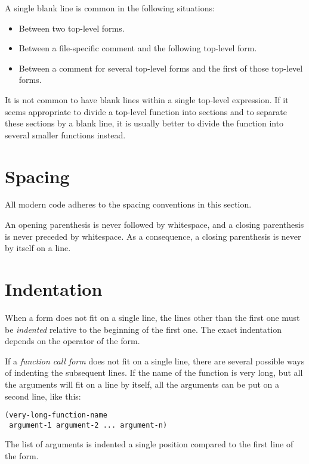 A single blank line is common in the following situations:

\begin{itemize}
\item Between two top-level forms.
\item Between a file-specific comment and the following top-level
  form.
\item Between a comment for several top-level forms and the first
  of those top-level forms.
\end{itemize}

It is not common to have blank lines within a single top-level
expression.  If it seems appropriate to divide a top-level function
into sections and to separate these sections by a blank line, it is
usually better to divide the function into several smaller functions
instead.

\section{Spacing}

All modern \commonlisp{} code adheres to the spacing conventions in
this section.

An opening parenthesis is never followed by whitespace, and a closing
parenthesis is never preceded by whitespace.  As a consequence, a
closing parenthesis is never by itself on a line. 

\section{Indentation}

When a form does not fit on a single line, the lines other than the
first one must be \emph{indented} relative to the beginning of the
first one.  The exact indentation depends on the operator of the
form.

If a \emph{function call form} does not fit on a single line, there
are several possible ways of indenting the subsequent lines.  If the
name of the function is very long, but all the arguments will fit on a
line by itself, all the arguments can be put on a second line, like
this:

\begin{verbatim}
(very-long-function-name
 argument-1 argument-2 ... argument-n)
\end{verbatim}

The list of arguments is indented a single position compared to the
first line of the form.

